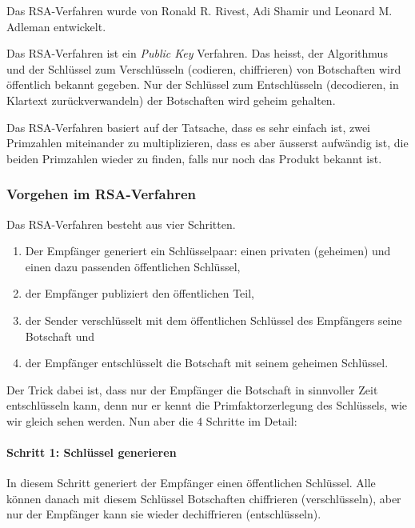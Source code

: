 Das RSA-Verfahren wurde von Ronald R. Rivest, Adi Shamir und Leonard M.
Adleman entwickelt.

Das RSA-Verfahren ist ein \emph{Public Key} Verfahren. Das heisst, der Algorithmus
und der Schlüssel zum Verschlüsseln (codieren, chiffrieren) von Botschaften wird
öffentlich bekannt gegeben. Nur der Schlüssel zum Entschlüsseln (decodieren,
in Klartext zurückverwandeln) der Botschaften wird geheim gehalten.

Das RSA-Verfahren basiert auf der Tatsache, dass es sehr einfach ist, zwei
Primzahlen miteinander zu multiplizieren, dass es aber äusserst aufwändig ist,
die beiden Primzahlen wieder zu finden, falls nur noch das Produkt bekannt ist.

\subsubsection*{Vorgehen im RSA-Verfahren}

Das RSA-Verfahren besteht aus vier Schritten.

\begin{enumerate}
    \item Der Empfänger generiert ein Schlüsselpaar: einen privaten (geheimen)
    und einen dazu passenden öffentlichen Schlüssel,
    \item der Empfänger publiziert den öffentlichen Teil,
    \item der Sender verschlüsselt mit dem öffentlichen Schlüssel des Empfängers
    seine Botschaft und
    \item der Empfänger entschlüsselt die Botschaft mit seinem geheimen Schlüssel.
\end{enumerate}

Der Trick dabei ist, dass nur der Empfänger die Botschaft in sinnvoller Zeit
entschlüsseln kann, denn nur er kennt die Primfaktorzerlegung des Schlüssels,
wie wir gleich sehen werden. Nun aber die 4 Schritte im Detail:

\paragraph*{Schritt 1: Schlüssel generieren}
In diesem Schritt generiert der Empfänger einen öffentlichen Schlüssel.
Alle können danach mit diesem Schlüssel Botschaften chiffrieren (verschlüsseln),
aber nur der Empfänger kann sie wieder dechiffrieren (entschlüsseln).


